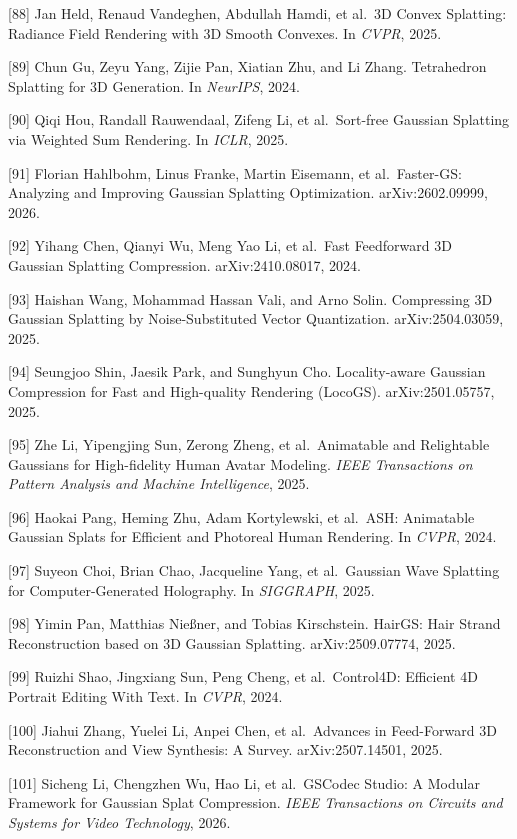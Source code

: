 {[}88{]} Jan Held, Renaud Vandeghen, Abdullah Hamdi, et al.~3D Convex Splatting: Radiance Field Rendering with 3D Smooth Convexes. In \emph{CVPR}, 2025.

{[}89{]} Chun Gu, Zeyu Yang, Zijie Pan, Xiatian Zhu, and Li Zhang. Tetrahedron Splatting for 3D Generation. In \emph{NeurIPS}, 2024.

{[}90{]} Qiqi Hou, Randall Rauwendaal, Zifeng Li, et al.~Sort-free Gaussian Splatting via Weighted Sum Rendering. In \emph{ICLR}, 2025.

{[}91{]} Florian Hahlbohm, Linus Franke, Martin Eisemann, et al.~Faster-GS: Analyzing and Improving Gaussian Splatting Optimization. arXiv:2602.09999, 2026.

{[}92{]} Yihang Chen, Qianyi Wu, Meng Yao Li, et al.~Fast Feedforward 3D Gaussian Splatting Compression. arXiv:2410.08017, 2024.

{[}93{]} Haishan Wang, Mohammad Hassan Vali, and Arno Solin. Compressing 3D Gaussian Splatting by Noise-Substituted Vector Quantization. arXiv:2504.03059, 2025.

{[}94{]} Seungjoo Shin, Jaesik Park, and Sunghyun Cho. Locality-aware Gaussian Compression for Fast and High-quality Rendering (LocoGS). arXiv:2501.05757, 2025.

{[}95{]} Zhe Li, Yipengjing Sun, Zerong Zheng, et al.~Animatable and Relightable Gaussians for High-fidelity Human Avatar Modeling. \emph{IEEE Transactions on Pattern Analysis and Machine Intelligence}, 2025.

{[}96{]} Haokai Pang, Heming Zhu, Adam Kortylewski, et al.~ASH: Animatable Gaussian Splats for Efficient and Photoreal Human Rendering. In \emph{CVPR}, 2024.

{[}97{]} Suyeon Choi, Brian Chao, Jacqueline Yang, et al.~Gaussian Wave Splatting for Computer-Generated Holography. In \emph{SIGGRAPH}, 2025.

{[}98{]} Yimin Pan, Matthias Nießner, and Tobias Kirschstein. HairGS: Hair Strand Reconstruction based on 3D Gaussian Splatting. arXiv:2509.07774, 2025.

{[}99{]} Ruizhi Shao, Jingxiang Sun, Peng Cheng, et al.~Control4D: Efficient 4D Portrait Editing With Text. In \emph{CVPR}, 2024.

{[}100{]} Jiahui Zhang, Yuelei Li, Anpei Chen, et al.~Advances in Feed-Forward 3D Reconstruction and View Synthesis: A Survey. arXiv:2507.14501, 2025.

{[}101{]} Sicheng Li, Chengzhen Wu, Hao Li, et al.~GSCodec Studio: A Modular Framework for Gaussian Splat Compression. \emph{IEEE Transactions on Circuits and Systems for Video Technology}, 2026.

